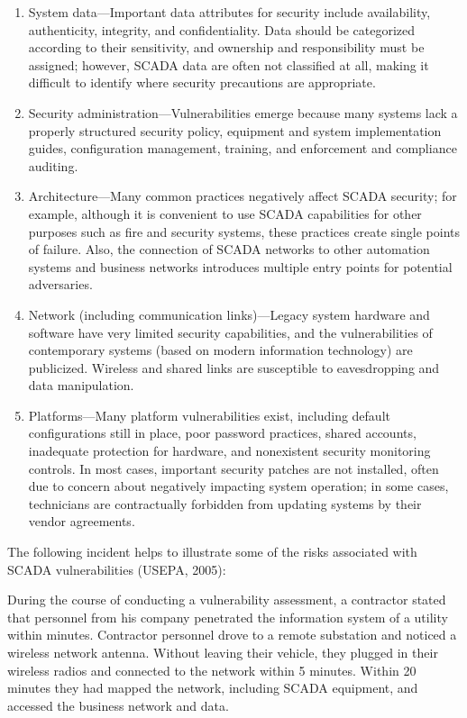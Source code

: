 \documentclass{article}
\begin{document}
\begin{enumerate}
\item
  System data---Important data attributes for security include
  availability, authenticity, integrity, and confidentiality. Data
  should be categorized according to their sensitivity, and ownership
  and responsibility must be assigned; however, SCADA data are often not
  classified at all, making it difficult to identify where security
  precautions are appropriate.
\item
  Security administration---Vulnerabilities emerge because many systems
  lack a properly structured security policy, equipment and system
  implementation guides, configuration management, training, and
  enforcement and compliance auditing.
\item
  Architecture---Many common practices negatively affect SCADA security;
  for example, although it is convenient to use SCADA capabilities for
  other purposes such as fire and security systems, these practices
  create single points of failure. Also, the connection of SCADA
  networks to other automation systems and business networks introduces
  multiple entry points for potential adversaries.
\item
  Network (including communication links)---Legacy system hardware and
  software have very limited security capabilities, and the
  vulnerabilities of contemporary systems (based on modern information
  technology) are publicized. Wireless and shared links are susceptible
  to eavesdropping and data manipulation.
\item
  Platforms---Many platform vulnerabilities exist, including default
  configurations still in place, poor password practices, shared
  accounts, inadequate protection for hardware, and nonexistent security
  monitoring controls. In most cases, important security patches are not
  installed, often due to concern about negatively impacting system
  operation; in some cases, technicians are contractually forbidden from
  updating systems by their vendor agreements.
\end{enumerate}

The following incident helps to illustrate some of the risks associated
with SCADA vulnerabilities (USEPA, 2005):

During the course of conducting a vulnerability assessment, a contractor
stated that personnel from his company penetrated the information system
of a utility within minutes. Contractor personnel drove to a remote
substation and noticed a wireless network antenna. Without leaving their
vehicle, they plugged in their wireless radios and connected to the
network within 5 minutes. Within 20 minutes they had mapped the network,
including SCADA equipment, and accessed the business network and data.
\end{document}
